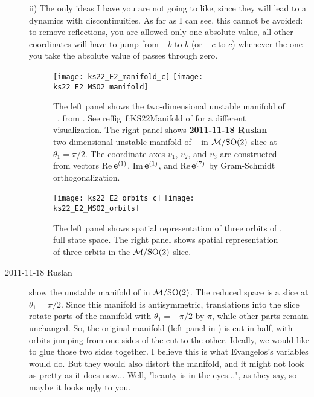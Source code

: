 \begin{description}
    ii) The only ideas I have you are not going to like, since they will lead to a dynamics with discontinuities.  As far as I can see, this cannot be avoided: to remove reflections, you are allowed only one absolute value, all other coordinates will have to jump from $-b$ to $b$ (or $-c$ to $c$) whenever the one you take the absolute value of passes through zero.

\begin{figure}[ht]
\begin{center}
\texttt{[image: ks22\_E2\_manifold\_c]}
\texttt{[image: ks22\_E2\_MSO2\_manifold]}
\end{center}
\caption{
The left panel shows the two-dimensional unstable manifold of \eqv\
, from . See reffig~{f:KS22Manifold} of
\refref{SCD07} for a different visualization. The right panel shows {\bf
2011-11-18 Ruslan} two-dimensional unstable manifold of \eqv\ \EQV{2} in
$\pS/\SOn{2}$ slice at $\theta_1 = \pi/2$. The coordinate axes $v_1$,
$v_2$, and $v_3$ are constructed from vectors Re\,$\jEigvec[1]$,
Im\,$\jEigvec[1]$, and {Re\,}$\jEigvec[7]$ by Gram-Schmidt
orthogonalization.
       }
\label{f:KS22E2man1}
\end{figure}

\begin{figure}[ht]
\begin{center}
\texttt{[image: ks22\_E2\_orbits\_c]}
\texttt{[image: ks22\_E2\_MSO2\_orbits]}
\end{center}
\caption{
The left panel shows spatial representation of three orbits of
, full state space. The right panel shows spatial
representation of three orbits in the $\pS/\SOn{2}$ slice.
       }
\label{f:ks22_E2_MSO2}
\end{figure}

\item[2011-11-18 Ruslan]  show the
unstable manifold of \EQV{2} in $\pS/\SOn{2}$. The reduced space is a
slice at $\theta_1 = \pi/2$. Since this manifold is antisymmetric,
translations into the slice rotate parts of the manifold with $\theta_1 =
-\pi/2$ by $\pi$, while other parts remain unchanged.  So, the original
manifold (left panel in \reffig{f:KS22E2man1}) is cut in half, with
orbits jumping from one sides of the cut to the other.  Ideally, we would
like to glue those two sides together. I believe this is what Evangelos's
variables would do.  But they would also distort the manifold, and it
might not look as pretty as it does now... Well, "beauty is in the
eyes...", as they say, so maybe it looks ugly to you.


\end{description}

